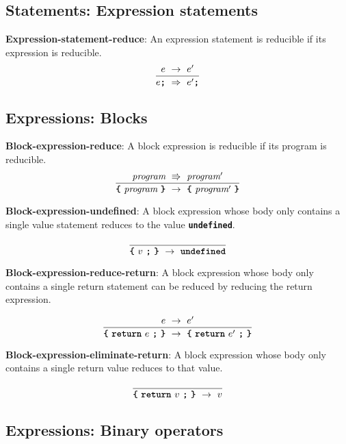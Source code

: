 \subsection*{Statements: Expression statements}

\textbf{Expression-statement-reduce}: An expression statement
is reducible if its expression is reducible.
\[
\frac{
  e\ \rightarrow\ e'
}{  
  e \textbf{\texttt{;}}
  \ \Rightarrow \ 
  e' \textbf{\texttt{;}}
}
\]


\subsection*{Expressions: Blocks}

\textbf{Block-expression-reduce}: A block expression is
reducible if its program is reducible.
\[
\frac{
  \textit{program} 
\ \Rrightarrow \ 
  \textit{program}'
}{  
  \textbf{\texttt{\{}} \
  \textit{program} \ 
  \textbf{\texttt{\}}}
\  \rightarrow \ 
  \textbf{\texttt{\{}} \
  \textit{program}' \ 
  \textbf{\texttt{\}}}
}
\]

\vspace{10mm}

\textbf{Block-expression-undefined}: A block expression
whose body only contains a single value statement reduces to
the value 
\textbf{\texttt{undefined}}.

\[
\frac{
}{  
  \textbf{\texttt{\{}} \
  v \ 
  \textbf{\texttt{;}} \ 
  \textbf{\texttt{\}}}
\  \rightarrow \ 
\textbf{\texttt{undefined}}
}
\]

\textbf{Block-expression-reduce-return}: A block expression
whose body only contains a single return statement can 
be reduced by reducing the return expression.

\[
\frac{
  e
\ \rightarrow \ 
  e'
}{  
  \textbf{\texttt{\{}} \
  \textbf{\texttt{return}} \ e \ 
  \textbf{\texttt{;}} \ 
  \textbf{\texttt{\}}}
\  \rightarrow \ 
  \textbf{\texttt{\{}} \
  \textbf{\texttt{return}} \ e' \ 
  \textbf{\texttt{;}} \ 
  \textbf{\texttt{\}}}
}
\]

\vspace{10mm}

\textbf{Block-expression-eliminate-return}: A block expression
whose body only contains a single return value reduces to
that value.

\[
\frac{
}{  
  \textbf{\texttt{\{}} \
  \textbf{\texttt{return}} \ v \ 
  \textbf{\texttt{;}} \ 
  \textbf{\texttt{\}}}
\  \rightarrow \ 
  v
}
\]


\subsection*{Expressions: Binary operators}

